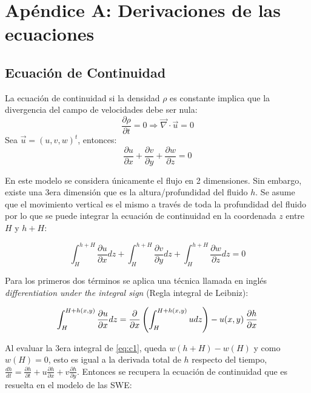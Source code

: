 \documentclass[12pt,dvipsnames]{exam}
\begin{document}
\section{Apéndice A: Derivaciones de las ecuaciones}
\subsection{Ecuación de Continuidad}

La ecuación de continuidad si la densidad $\rho$ es constante implica que la divergencia del campo de velocidades debe ser nula:
\begin{equation*}
    \frac{\partial \rho}{\partial t} = 0 \Rightarrow \vec{\nabla}    \cdot \vec{u} = 0
\end{equation*}
Sea $\vec{u} = (u,v,w)^{t}$, entonces:
\begin{equation*}
    \frac{\partial u}{\partial x} + \frac{\partial v}{\partial y} + \frac{\partial w}{\partial z} = 0
\end{equation*}

En este modelo se considera únicamente el flujo en 2 dimensiones. Sin embargo, existe una 3era dimensión que es la altura/profundidad del fluido $h$. Se asume que el movimiento vertical es el mismo a través de toda la profundidad del fluido por lo que se puede integrar la ecuación de continuidad en la coordenada $z$ entre $H$ y $h+H$:

\begin{equation}
    \int_{H}^{h+H}\frac{\partial u}{\partial x} dz + \int_{H}^{h+H}\frac{\partial v}{\partial y} dz + \int_{H}^{h+H}\frac{\partial w}{\partial z} dz = 0
\label{eq:c1}
\end{equation}

Para los primeros dos términos se aplica una técnica llamada en inglés \textit{differentiation under the integral sign} (Regla integral de Leibniz):

\begin{equation*}
        \int_{H}^{H + h(x,y)}\frac{\partial u}{\partial x} dz = \frac{\partial}{\partial x}\left(\int_{H}^{H + h(x,y)} u dz \right) - u(x,y) \hspace{0.08cm}\frac{\partial h}{\partial x}
\end{equation*}

Al evaluar la 3era integral de \ref{eq:c1}, queda $w(h+H) - w(H)$ y como $w(H) = 0$, esto es igual a la derivada total de $h$ respecto del tiempo, $\frac{d h}{dt} = \frac{\partial h}{\partial t} + u \frac{\partial h}{\partial x} + v \frac{\partial h}{\partial y}$. Entonces se recupera la ecuación de continuidad que es resuelta en el modelo de las SWE:
\end{document}
